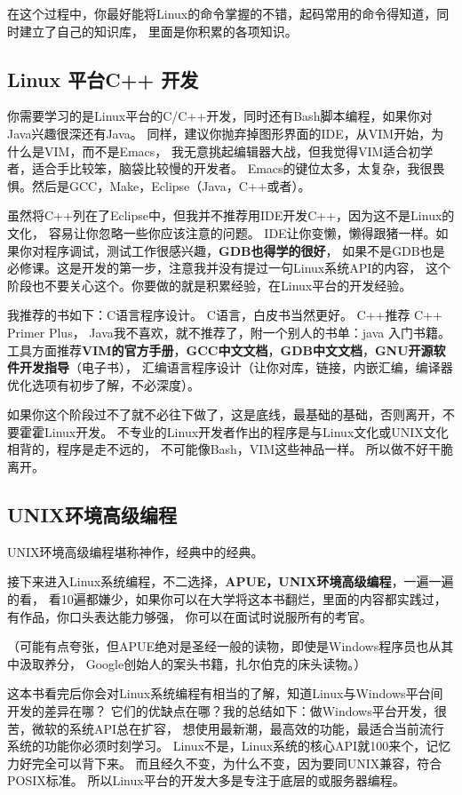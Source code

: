 \documentclass[UTF8,a4paper,12pt]{ctexbook}
\begin{document}
			在这个过程中，你最好能将Linux的命令掌握的不错，起码常用的命令得知道，同时建立了自己的知识库， 里面是你积累的各项知识。
		
		\subsection{Linux 平台C++ 开发}
			你需要学习的是Linux平台的C/C++开发，同时还有Bash脚本编程，如果你对Java兴趣很深还有Java。 同样，建议你抛弃掉图形界面的IDE，从VIM开始，为什么是VIM，而不是Emacs， 我无意挑起编辑器大战，但我觉得VIM适合初学者，适合手比较笨，脑袋比较慢的开发者。 Emacs的键位太多，太复杂，我很畏惧。然后是GCC，Make，Eclipse（Java，C++或者）。
			
			虽然将C++列在了Eclipse中，但我并不推荐用IDE开发C++，因为这不是Linux的文化， 容易让你忽略一些你应该注意的问题。 IDE让你变懒，懒得跟猪一样。如果你对程序调试，测试工作很感兴趣，\textbf{GDB也得学的很好}， 如果不是GDB也是必修课。这是开发的第一步，注意我并没有提过一句Linux系统API的内容， 这个阶段也不要关心这个。你要做的就是积累经验，在Linux平台的开发经验。
			
			我推荐的书如下：C语言程序设计。 C语言，白皮书当然更好。 C++推荐 C++ Primer Plus， Java我不喜欢，就不推荐了，附一个别人的书单：java 入门书籍。 工具方面推荐\textbf{VIM的官方手册}，\textbf{GCC中文文档}，\textbf{GDB中文文档}，\textbf{GNU开源软件开发指导}（电子书）， 汇编语言程序设计（让你对库，链接，内嵌汇编，编译器优化选项有初步了解，不必深度）。
			
			如果你这个阶段过不了就不必往下做了，这是底线，最基础的基础，否则离开，不要霍霍Linux开发。 不专业的Linux开发者作出的程序是与Linux文化或UNIX文化相背的，程序是走不远的， 不可能像Bash，VIM这些神品一样。 所以做不好干脆离开。
		
		\subsection{UNIX环境高级编程}
			UNIX环境高级编程堪称神作，经典中的经典。
			
			接下来进入Linux系统编程，不二选择，\textbf{APUE，UNIX环境高级编程}，一遍一遍的看， 看10遍都嫌少，如果你可以在大学将这本书翻烂，里面的内容都实践过，有作品，你口头表达能力够强， 你可以在面试时说服所有的考官。
			
			（可能有点夸张，但APUE绝对是圣经一般的读物，即使是Windows程序员也从其中汲取养分， Google创始人的案头书籍，扎尔伯克的床头读物。）
			
			这本书看完后你会对Linux系统编程有相当的了解，知道Linux与Windows平台间开发的差异在哪？ 它们的优缺点在哪？我的总结如下：做Windows平台开发，很苦，微软的系统API总在扩容， 想使用最新潮，最高效的功能，最适合当前流行系统的功能你必须时刻学习。 Linux不是，Linux系统的核心API就100来个，记忆力好完全可以背下来。 而且经久不变，为什么不变，因为要同UNIX兼容，符合POSIX标准。 所以Linux平台的开发大多是专注于底层的或服务器编程。
			
\end{document}
